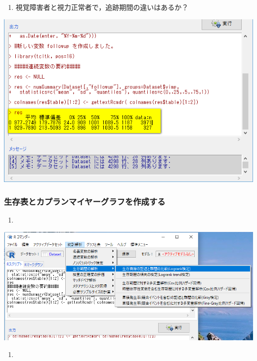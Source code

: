 \documentclass[]{problemset}
\providecommand{\tightlist}{%
  \setlength{\itemsep}{0pt}\setlength{\parskip}{0pt}}
\begin{document}
\begin{enumerate}
\def\labelenumi{\arabic{enumi}.}
\setcounter{enumi}{9}
\tightlist
\item
  視覚障害者と視力正常者で，追跡期間の違いはあるか？
\end{enumerate}

\begin{center}\includegraphics[width=0.55\linewidth,height=0.35\textheight]{pic/survival0903} \end{center}

\subsubsection{生存表とカプランマイヤーグラフを作成する}

\begin{enumerate}
\def\labelenumi{\arabic{enumi}.}
\item
\end{enumerate}

\begin{center}\includegraphics[width=0.7\linewidth,height=0.35\textheight]{pic/survival07} \end{center}

\begin{enumerate}
\def\labelenumi{\arabic{enumi}.}
\setcounter{enumi}{1}
\item
\end{enumerate}
\end{document}
